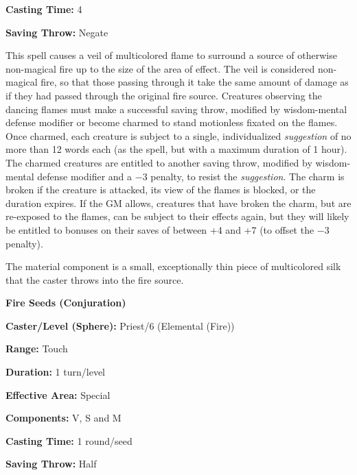 \begin{multicols}{2}
\begin{minipage}{\columnwidth}
\noindent \textbf{Casting Time:} 4

\noindent \textbf{Saving Throw:} Negate

\end{minipage}

This spell causes a veil of multicolored flame to surround a source of otherwise non-magical fire up to the size of the area of effect.  The veil is considered non-magical fire, so that those passing through it take the same amount of damage as if they had passed through the original fire source.  Creatures observing the dancing flames must make a successful saving throw, modified by wisdom-mental defense modifier or become charmed to stand motionless fixated on the flames.  Once charmed, each creature is subject to a single, individualized \textit{suggestion} of no more than 12 words each (as the spell, but with a maximum duration of 1 hour).  The charmed creatures are entitled to another saving throw, modified by wisdom-mental defense modifier and a $-3$ penalty, to resist the \textit{suggestion}.  The charm is broken if the creature is attacked, its view of the flames is blocked, or the duration expires.  If the GM allows, creatures that have broken the charm, but are re-exposed to the flames, can be subject to their effects again, but they will likely be entitled to bonuses on their saves of between +4 and +7 (to offset the $-3$ penalty).

The material component is a small, exceptionally thin piece of multicolored silk that the caster throws into the fire source.

\vspace{1em}

\noindent
\begin{minipage}{\columnwidth}

\noindent \textbf{Fire Seeds (Conjuration)}

\noindent \textbf{Caster/Level (Sphere):} Priest/6 (Elemental (Fire))

\noindent \textbf{Range:} Touch

\noindent \textbf{Duration:} 1 turn/level

\noindent \textbf{Effective Area:} Special

\noindent \textbf{Components:} V, S and M

\noindent \textbf{Casting Time:} 1 round/seed

\noindent \textbf{Saving Throw:} Half 

\end{minipage}


\end{multicols}
